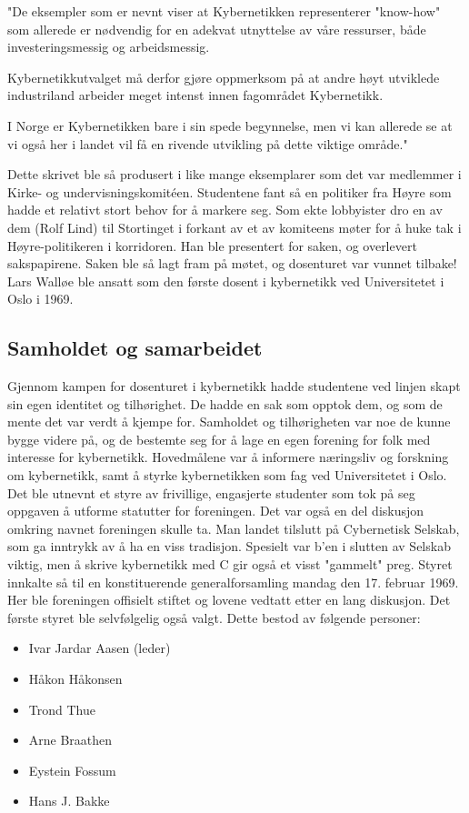 \documentclass[../main.tex]{subfiles}
\begin{document}
"De eksempler som er nevnt viser at Kybernetikken representerer "know-how" som allerede er nødvendig for en adekvat utnyttelse av våre ressurser, både investeringsmessig og arbeidsmessig.

Kybernetikkutvalget må derfor gjøre oppmerksom på at andre høyt utviklede industriland arbeider meget intenst innen fagområdet Kybernetikk.

I Norge er Kybernetikken bare i sin spede begynnelse, men vi kan allerede se at vi også her i landet vil få en rivende utvikling på dette viktige område."

Dette skrivet ble så produsert i like mange eksemplarer som det var medlemmer i Kirke- og undervisningskomitéen. Studentene fant så en politiker fra Høyre som hadde et relativt stort behov for å markere seg. Som ekte lobbyister dro en av dem (Rolf Lind) til Stortinget i forkant av et av komiteens møter for å huke tak i Høyre-politikeren i korridoren. Han ble presentert for saken, og overlevert sakspapirene. Saken ble så lagt fram på møtet, og dosenturet var vunnet tilbake!
Lars Walløe ble ansatt som den første dosent i kybernetikk ved Universitetet i Oslo i 1969.

\subsection{Samholdet og samarbeidet}
Gjennom kampen for dosenturet i kybernetikk hadde studentene ved linjen skapt sin egen identitet og tilhørighet. De hadde en sak som opptok dem, og som de mente det var verdt å kjempe for. Samholdet og tilhørigheten var noe de kunne bygge videre på, og de bestemte seg for å lage en egen forening for folk med interesse for kybernetikk. Hovedmålene var å informere næringsliv og forskning om kybernetikk, samt å styrke kybernetikken som fag ved Universitetet i Oslo.
Det ble utnevnt et styre av frivillige, engasjerte studenter som tok på seg oppgaven å utforme statutter for foreningen. Det var også en del diskusjon omkring navnet foreningen skulle ta. Man landet tilslutt på Cybernetisk Selskab, som ga inntrykk av å ha en viss tradisjon. Spesielt var b'en i slutten av Selskab viktig, men å skrive kybernetikk med C gir også et visst "gammelt" preg. Styret innkalte så til en konstituerende generalforsamling mandag den 17. februar 1969. Her ble foreningen offisielt stiftet og lovene vedtatt etter en lang diskusjon. Det første styret ble selvfølgelig også valgt. Dette bestod av følgende personer:

\begin{itemize}
\item Ivar Jardar Aasen (leder)
\item Håkon Håkonsen
\item Trond Thue
\item Arne Braathen
\item Eystein Fossum
\item Hans J. Bakke
\end{itemize}
\end{document}
